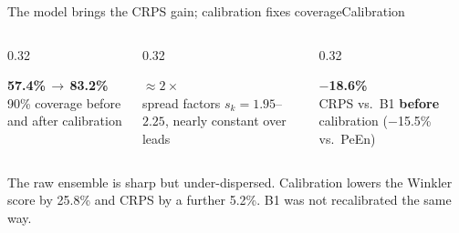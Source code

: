 \documentclass[aspectratio=169,11pt]{beamer}
\begin{document}
\begin{frame}{The model brings the CRPS gain; calibration fixes coverage}{Calibration}
\begin{columns}[T]
\begin{column}{0.32\textwidth}
\begin{card}{}{\Large\bfseries\color{inmicNavy}57.4\%\,$\to$\,83.2\%}\\[1mm]\small 90\% coverage before and after calibration\end{card}
\end{column}
\begin{column}{0.32\textwidth}
\begin{card}{}{\Large\bfseries\color{inmicNavy}$\approx 2\times$}\\[1mm]\small spread factors $s_k=1.95$--$2.25$, nearly constant over leads\end{card}
\end{column}
\begin{column}{0.32\textwidth}
\begin{card}{}{\Large\bfseries\color{inmicNavy}$-$18.6\%}\\[1mm]\small CRPS vs.\ B1 \textbf{before} calibration ($-$15.5\% vs.\ PeEn)\end{card}
\end{column}
\end{columns}
\vspace{2mm}
\begin{callout}
The raw ensemble is sharp but under-dispersed. Calibration lowers the Winkler score by 25.8\% and CRPS by a further 5.2\%. B1 was not recalibrated the same way.
\end{callout}
\end{frame}
\end{document}
